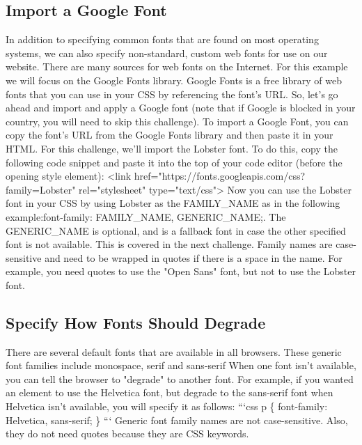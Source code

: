 \documentclass{article}%
\begin{document}
%
\subsection{Import a Google Font}%
\label{subsec:ImportaGoogleFont}%
In addition to specifying common fonts that are found on most operating systems, we can also specify non{-}standard, custom web fonts for use on our website. There are many sources for web fonts on the Internet. For this example we will focus on the Google Fonts library.\newline%
Google Fonts is a free library of web fonts that you can use in your CSS by referencing the font's URL.\newline%
So, let's go ahead and import and apply a Google font (note that if Google is blocked in your country, you will need to skip this challenge).\newline%
To import a Google Font, you can copy the font's URL from the Google Fonts library and then paste it in your HTML. For this challenge, we'll import the Lobster font. To do this, copy the following code snippet and paste it into the top of your code editor (before the opening style element):\newline%
<link href="https://fonts.googleapis.com/css?family=Lobster" rel="stylesheet" type="text/css">\newline%
Now you can use the Lobster font in your CSS by using Lobster as the FAMILY\_NAME as in the following example:font{-}family: FAMILY\_NAME, GENERIC\_NAME;.\newline%
The GENERIC\_NAME is optional, and is a fallback font in case the other specified font is not available. This is covered in the next challenge.\newline%
Family names are case{-}sensitive and need to be wrapped in quotes if there is a space in the name. For example, you need quotes to use the "Open Sans" font, but not to use the Lobster font.\newline%

%
\subsection{Specify How Fonts Should Degrade}%
\label{subsec:SpecifyHowFontsShouldDegrade}%
There are several default fonts that are available in all browsers. These generic font families include monospace, serif and sans{-}serif\newline%
When one font isn't available, you can tell the browser to "degrade" to another font.\newline%
For example, if you wanted an element to use the Helvetica font, but degrade to the sans{-}serif font when Helvetica isn't available, you will specify it as follows:\newline%
```css\newline%
p \{\newline%
  font{-}family: Helvetica, sans{-}serif;\newline%
\}\newline%
```\newline%
Generic font family names are not case{-}sensitive. Also, they do not need quotes because they are CSS keywords.\newline%
\end{document}
